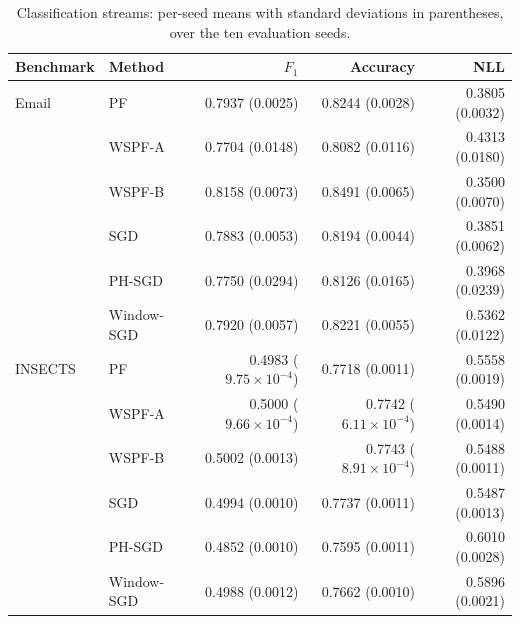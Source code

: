 \begin{table}[htbp]
\centering
\footnotesize
\setlength{\tabcolsep}{3pt}
\caption{Classification streams: per-seed means with standard deviations in parentheses, over the ten evaluation seeds.}
\label{tab:s3c_classification_levels}
\begin{tabular}{@{}llrrr@{}}
\toprule
Benchmark & Method & $F_1$ & Accuracy & NLL \\
\midrule
Email & PF & 0.7937 (0.0025) & 0.8244 (0.0028) & 0.3805 (0.0032) \\
 & WSPF-A & 0.7704 (0.0148) & 0.8082 (0.0116) & 0.4313 (0.0180) \\
 & WSPF-B & 0.8158 (0.0073) & 0.8491 (0.0065) & 0.3500 (0.0070) \\
 & SGD & 0.7883 (0.0053) & 0.8194 (0.0044) & 0.3851 (0.0062) \\
 & PH-SGD & 0.7750 (0.0294) & 0.8126 (0.0165) & 0.3968 (0.0239) \\
 & Window-SGD & 0.7920 (0.0057) & 0.8221 (0.0055) & 0.5362 (0.0122) \\
\midrule
INSECTS & PF & 0.4983 ($9.75\times 10^{-4}$) & 0.7718 (0.0011) & 0.5558 (0.0019) \\
 & WSPF-A & 0.5000 ($9.66\times 10^{-4}$) & 0.7742 ($6.11\times 10^{-4}$) & 0.5490 (0.0014) \\
 & WSPF-B & 0.5002 (0.0013) & 0.7743 ($8.91\times 10^{-4}$) & 0.5488 (0.0011) \\
 & SGD & 0.4994 (0.0010) & 0.7737 (0.0011) & 0.5487 (0.0013) \\
 & PH-SGD & 0.4852 (0.0010) & 0.7595 (0.0011) & 0.6010 (0.0028) \\
 & Window-SGD & 0.4988 (0.0012) & 0.7662 (0.0010) & 0.5896 (0.0021) \\
\bottomrule
\end{tabular}
\end{table}
